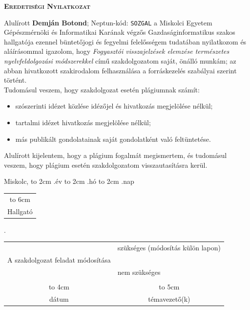 \vspace*{1cm}  
\begin{center}
\large\textsc{\bfseries Eredetiségi Nyilatkozat}
\end{center}
\vspace*{2cm}  

Alulírott \textbf{Demján Botond}; Neptun-kód: \texttt{SOZGAL} a Miskolci Egyetem Gépészmérnöki és Informatikai Karának végzős Gazdaságinformatikus szakos hallgatója ezennel büntetőjogi és fegyelmi felelősségem tudatában nyilatkozom és aláírásommal igazolom, hogy \textit{Fogyasztói visszajelzések elemzése természetes nyelvfeldolgozási módszerekkel}
című szakdolgozatom saját, önálló munkám; az abban hivatkozott szakirodalom
felhasználása a forráskezelés szabályai szerint történt.\\

Tudomásul veszem, hogy szakdolgozat esetén plágiumnak számít:
\begin{itemize}
\item szószerinti idézet közlése idézőjel és hivatkozás megjelölése nélkül;
\item tartalmi idézet hivatkozás megjelölése nélkül;
\item más publikált gondolatainak saját gondolatként való feltüntetése.
\end{itemize}

Alulírott kijelentem, hogy a plágium fogalmát megismertem, és tudomásul veszem, hogy
plágium esetén szakdolgozatom visszautasításra kerül.

\vspace*{3cm}

\noindent Miskolc, \hbox to 2cm{\dotfill} .év \hbox to 2cm{\dotfill} .hó \hbox to 2cm{\dotfill} .nap

\vspace*{3cm}

\hspace*{8cm}\begin{tabular}{c}
\hbox to 6cm{\dotfill}\\
Hallgató
\end{tabular}



\newpage
\begingroup
\renewcommand{\arraystretch}{1.2} %

.

\begin{tabular}{cl}
&szükséges (módosítás külön lapon) \\
A szakdolgozat feladat módosítása& \\
& nem szükséges\\
&\\
\hbox to 4cm{\dotfill}&\multicolumn{1}{c}{\hbox to 5cm{\dotfill}}\\
dátum& \multicolumn{1}{c}{témavezető(k)}
\end{tabular}
\vskip1.5mm

